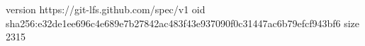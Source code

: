 version https://git-lfs.github.com/spec/v1
oid sha256:e32de1ee696c4e689e7b27842ac483f43e937090f0c31447ac6b79efcf943bf6
size 2315
